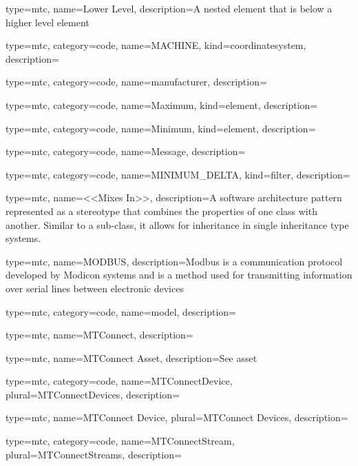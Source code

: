{
  type=mtc,
  name={Lower Level},
  description={A nested element that is below a higher level element}
}


{
  type=mtc,
  category=code,
  name={MACHINE},
  kind={coordinatesystem},
  description={}
}


{
  type=mtc,
  category=code,
  name={manufacturer},
  description={}
}


{
  type=mtc,
  category=code,
  name={Maximum},
  kind={element},
  description={}
}


{
  type=mtc,
  category=code,
  name={Minimum},
  kind={element},
  description={}
}


{
  type=mtc,
  category=code,
  name={Message},
  description={}
}


{
  type=mtc,
  category=code,
  name={MINIMUM\_DELTA},
  kind={filter},
  description={}
}


{
  type=mtc,
  name={<<Mixes In>>},
  description={A software architecture pattern represented as a \gls{stereotype} that combines the properties of one class with another. Similar to a sub-class, it allows for inheritance in single inheritance type systems.}
}


{
  type=mtc,
  name=MODBUS,
  description={Modbus is a communication protocol developed by Modicon systems and is a method used for transmitting information over serial lines between electronic devices}
}


{
  type=mtc,
  category=code,
  name={model},
  description={}
}


{
  type=mtc,
  name={MTConnect},
  description={}
}


{
  type=mtc,
  name={MTConnect Asset},
  description={See \gls{asset}}
}


{
  type=mtc,
  category=code,
  name={MTConnectDevice},
  plural={MTConnectDevices},
  description={}
}


{
  type=mtc,
  name={MTConnect Device},
  plural={MTConnect Devices},
  description={}
}


{
  type=mtc,
  category=code,
  name={MTConnectStream},
  plural={MTConnectStreams},
  description={}
}


